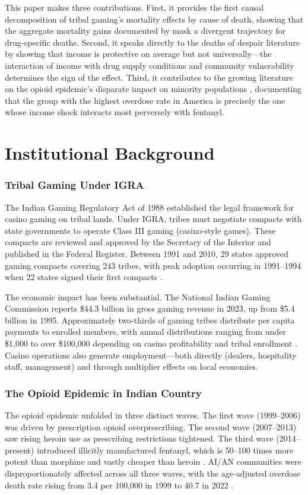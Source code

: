 \documentclass[12pt]{article}
\begin{document}
This paper makes three contributions. First, it provides the first causal decomposition of tribal gaming's mortality effects by cause of death, showing that the aggregate mortality gains documented by \citet{akee2015young} mask a divergent trajectory for drug-specific deaths. Second, it speaks directly to the deaths of despair literature by showing that income is protective on average but not universally---the interaction of income with drug supply conditions and community vulnerability determines the sign of the effect. Third, it contributes to the growing literature on the opioid epidemic's disparate impact on minority populations \citep{hansen2020economics, ruhm2019deaths}, documenting that the group with the highest overdose rate in America is precisely the one whose income shock interacts most perversely with fentanyl.

\section{Institutional Background}

\subsubsection*{Tribal Gaming Under IGRA} The Indian Gaming Regulatory Act of 1988 established the legal framework for casino gaming on tribal lands. Under IGRA, tribes must negotiate compacts with state governments to operate Class III gaming (casino-style games). These compacts are reviewed and approved by the Secretary of the Interior and published in the Federal Register. Between 1991 and 2010, 29 states approved gaming compacts covering 243 tribes, with peak adoption occurring in 1991--1994 when 22 states signed their first compacts \citep{evans2002economic}.

The economic impact has been substantial. The National Indian Gaming Commission reports \$44.3 billion in gross gaming revenue in 2023, up from \$5.4 billion in 1995. Approximately two-thirds of gaming tribes distribute per capita payments to enrolled members, with annual distributions ranging from under \$1,000 to over \$100,000 depending on casino profitability and tribal enrollment \citep{akee2010effects}. Casino operations also generate employment---both directly (dealers, hospitality staff, management) and through multiplier effects on local economies.

\subsubsection*{The Opioid Epidemic in Indian Country} The opioid epidemic unfolded in three distinct waves. The first wave (1999--2006) was driven by prescription opioid overprescribing. The second wave (2007--2013) saw rising heroin use as prescribing restrictions tightened. The third wave (2014--present) introduced illicitly manufactured fentanyl, which is 50--100 times more potent than morphine and vastly cheaper than heroin \citep{ciccarone2019rise}. AI/AN communities were disproportionately affected across all three waves, with the age-adjusted overdose death rate rising from 3.4 per 100,000 in 1999 to 40.7 in 2022 \citep{hedegaard2020drug}.
\end{document}

